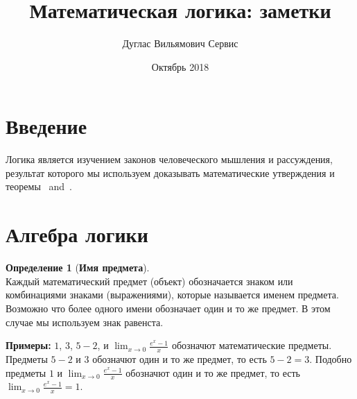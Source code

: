 \documentclass[fleqn,11pt]{article}
\theoremstyle{definition}
\newtheorem{definition}{Определение}
\begin{document}
\title{Математическая логика: заметки}
\author{Дуглас Вильямович Сервис}
\date{Октябрь 2018}
\maketitle

\section{Введение}
Логика является изучением законов человеческого мышления и рассуждения, результат которого мы
используем доказывать математические утверждения и
теоремы~\parencite{Lektarnekov2009} and~\parencite{КолДраг2006}.

\section{Алгебра логики}

\begin{definition}[\textbf{Имя предмета}] ~\\
	Каждый математический предмет (объект) обозначается знаком или комбинациями знаками (выражениями), которые
	называется именем предмета. Возможно что более одного имени обозначает один и то же предмет. В этом случае мы
  используем знак равенста.
\end{definition}
\begin{center}
	\begin{minipage}{.9\textwidth}
		\textbf{Примеры:} $1$, $3$, $5-2$, и $\lim_{x \to 0} \frac{e^x-1}{x}$ обозначют математические предметы.
		Предметы $5-2$ и $3$ обозначют один и то же предмет, то есть $5 - 2 = 3$. Подобно предметы $1$ и
    $\lim_{x \to 0} \frac{e^x-1}{x}$ обозначют один и то же предмет, то есть $\lim_{x \to 0} \frac{e^x-1}{x} = 1$.
	\end{minipage}
\end{center}
\end{document}
